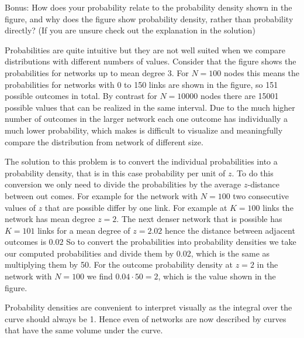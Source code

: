 \subquestion Bonus: How does your probability relate to the probability density shown in the figure, and why does the figure show probability density, rather than probability directly? (If you are unsure check out the explanation in the solution) 

\solution

Probabilities are quite intuitive but they are not well suited when we compare distributions with different numbers of values. Consider that the figure shows the probabilities for networks up to mean degree 3. For $N=100$ nodes this means the probabilities for networks with 0 to 150 links are shown in the figure, so 151 possible outcomes in total. By contrast for $N=10000$ nodes there are 15001 possible values that can be realized in the same interval. Due to the much higher number of outcomes in the larger network each one outcome has individually a much lower probability, which makes is difficult to visualize and meaningfully compare the distribution from network of different size. 

The solution to this problem is to convert the individual probabilities into a probability density, that is in this case probability per unit of $z$. To do this conversion we only need to divide the probabilities by the average $z$-distance between out comes. For example for the network with $N=100$ two consecutive values of $z$ that are possible differ by one link. For example at $K=100$ links the network has mean degree $z=2$. The next denser network that is possible has $K=101$ links for a mean degree  of $z=2.02$ hence the distance between adjacent outcomes is $0.02$ So to convert the probabilities into probability densities we take our computed probabilities and divide them by 0.02, which is the same as multiplying them by 50. For the outcome probability density at $z=2$ in the network with $N=100$ we find $0.04\cdot 50 = 2$, which is the value shown in the figure. 

Probability densities are convenient to interpret visually as the integral over the curve should always be 1. Hence even of networks are now described by curves that have the same volume under the curve. 

